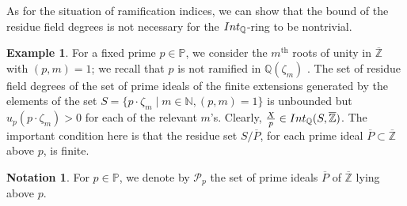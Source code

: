 \documentclass{article}
\theoremstyle{definition}\newtheorem{Def}[equation]{Definition}
\newtheorem{Ex}[equation]{Example}
\theoremstyle{definition}\newtheorem{Ques}[equation]{Question}
\theoremstyle{definition}\newtheorem{Conj}[equation]{Conjecture}
\theoremstyle{definition}\newtheorem{Not}[equation]{Notation}
\newcommand{\N}{\mathbb{N}}
\newcommand{\Q}{\mathbb{Q}}
\newcommand{\oQ}{\overline{\Q}}
\newcommand{\oZ}{\overline{\Z}}
\newcommand{\oP}{\overline{P}}
\newcommand{\Z}{\mathbb{Z}}
\newcommand{\Int}{\textnormal{Int}}
\newcommand{\IntQ}{\Int_{\Q}}
\newcommand{\PP}{\mathbb{P}}
\newcommand{\rc}{ \color{red}}
\newcommand{\mcP}{\mathcal{P}}
\numberwithin{equation}{section}
\begin{document}




As for the situation of ramification indices, we can show that the bound of the residue field degrees is not necessary for the $\IntQ$-ring to be nontrivial.

\begin{Ex}
    For a fixed prime $p\in\PP$, we consider the $m^{\text{th}}$ roots of unity in $\oZ$ with $(p,m)=1$; we recall that $p$ is not ramified in $\Q(\zeta_m)$ \cite[Corollary of Theorem 26]{Marcus}. The set of residue field degrees of the set of prime ideals of the finite extensions generated by the elements of the set $S=\{p\cdot\zeta_m\mid m\in\N, (p,m)=1\}$ is unbounded but $u_p(p\cdot\zeta_m)>0$ for each of the relevant $m$'s.  Clearly, $\frac{X}{p}\in\IntQ(S,\oZ)$. The important condition here is that the residue set $S/\oP$, for each prime ideal $\oP\subset\oZ$ above $p$, is finite.
\end{Ex}



\begin{Not}
For $p \in \PP$, we denote by $\mcP_p$ the set of prime ideals $\oP$ of $\oZ$ lying above $p$.
\end{Not}
\end{document}
